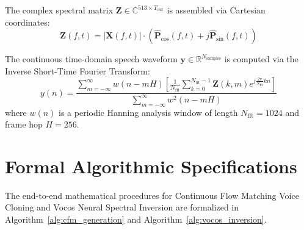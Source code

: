 The complex spectral matrix $\mathbf{Z} \in \mathbb{C}^{513 \times T_{\text{out}}}$ is assembled via Cartesian coordinates:
\begin{equation}
    \mathbf{Z}(f, t) = |\mathbf{X}(f, t)| \cdot \left( \hat{\mathbf{P}}_{\text{cos}}(f, t) + j \hat{\mathbf{P}}_{\text{sin}}(f, t) \right)
    \label{eq:complex_assembly}
\end{equation}

The continuous time-domain speech waveform $\mathbf{y} \in \mathbb{R}^{N_{\text{samples}}}$ is computed via the Inverse Short-Time Fourier Transform:
\begin{equation}
    y(n) = \frac{\sum_{m=-\infty}^\infty w(n - mH) \left[ \frac{1}{N_{\text{fft}}} \sum_{k=0}^{N_{\text{fft}}-1} \mathbf{Z}(k, m) e^{j \frac{2\pi}{N_{\text{fft}}} kn} \right]}{\sum_{m=-\infty}^\infty w^2(n - mH)}
    \label{eq:istft_formal}
\end{equation}
where $w(n)$ is a periodic Hanning analysis window of length $N_{\text{fft}} = 1024$ and frame hop $H = 256$.

\section{Formal Algorithmic Specifications}
The end-to-end mathematical procedures for Continuous Flow Matching Voice Cloning and Vocos Neural Spectral Inversion are formalized in Algorithm~\ref{alg:cfm_generation} and Algorithm~\ref{alg:vocos_inversion}.

